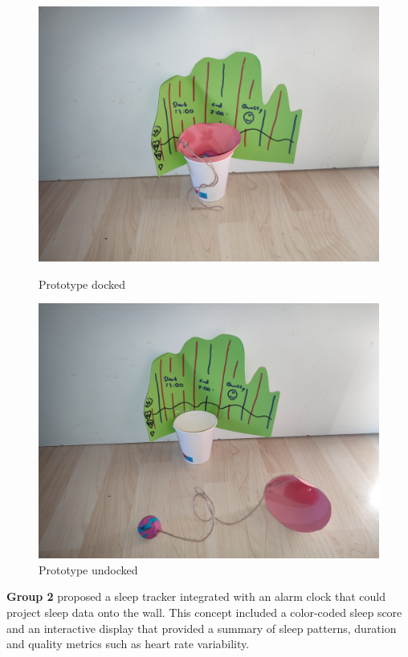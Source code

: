 \documentclass[
  a4paper,  %
  twoside,  %
  bibliography=totoc,
  headsepline,
  cleardoublepage=empty,
  parskip=half,
  draft=false
]{scrbook}
\begin{document}
\begin{figure}[H]
  \centering
  \begin{minipage}[b]{0.4\textwidth}
    \includegraphics[width=\textwidth]{graphics/FocusGroup1.jpg}
    \caption{Prototype docked}
  \end{minipage}
  \begin{minipage}[b]{0.4\textwidth}
    \includegraphics[width=\textwidth]{graphics/FocusGroup1_2.jpg}
    \caption{Prototype undocked}
  \end{minipage}
\end{figure}

\textbf{Group 2} proposed a sleep tracker integrated with an alarm clock that could project sleep data onto the wall. This concept included a color-coded sleep score and an interactive display that provided a summary of sleep patterns, duration and quality metrics such as heart rate variability.
\end{document}
